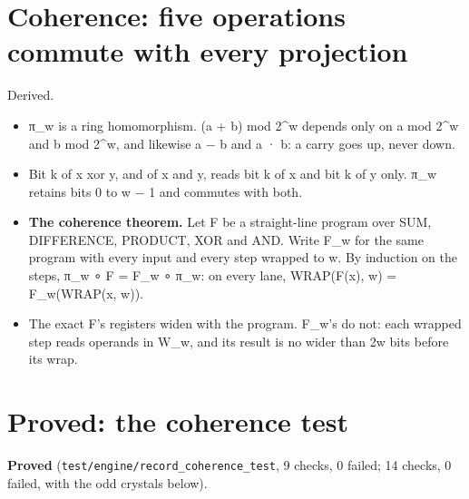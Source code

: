 \section{\texorpdfstring{Coherence: five operations commute with every projection}{Coherence: five operations commute with every projection}}

Derived.

\begin{itemize}
\item π\_\allowbreak{}w is a ring homomorphism. (a + b) mod 2\textasciicircum{}w depends only on a mod 2\textasciicircum{}w and b mod 2\textasciicircum{}w, and likewise a − b and a · b: a carry goes up, never down.
\item Bit k of x xor y, and of x and y, reads bit k of x and bit k of y only. π\_\allowbreak{}w retains bits 0 to w − 1 and commutes with both.
\item \textbf{The coherence theorem.} Let F be a straight-line program over SUM, DIFFERENCE, PRODUCT, XOR and AND. Write F\_\allowbreak{}w for the same program with every input and every step wrapped to w. By induction on the steps, π\_\allowbreak{}w ∘ F = F\_\allowbreak{}w ∘ π\_\allowbreak{}w: on every lane, WRAP(F(x), w) = F\_\allowbreak{}w(WRAP(x, w)).
\item The exact F's registers widen with the program. F\_\allowbreak{}w's do not: each wrapped step reads operands in W\_\allowbreak{}w, and its result is no wider than 2w bits before its wrap.
\end{itemize}

\section{\texorpdfstring{Proved: the coherence test}{Proved: the coherence test}}

\textbf{Proved} (\texttt{test/\allowbreak{}engine/\allowbreak{}record\_\allowbreak{}coherence\_\allowbreak{}test}, 9 checks, 0 failed; 14 checks, 0 failed, with the odd crystals below).

